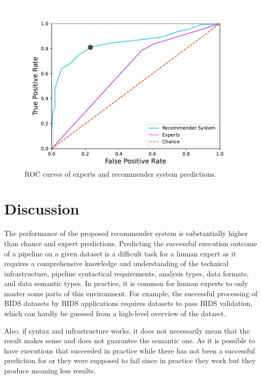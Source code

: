 \begin{figure}
\centering
  \includegraphics[width=\columnwidth]{figures/ROC Curve.pdf}
  \caption{ROC curves of experts and recommender system predictions.}
  \label{fig:roc-curve}
\end{figure}

\section{Discussion}

The performance of the proposed recommender system is substantially higher
than chance and expert predictions. Predicting the successful execution
outcome of a pipeline on a given dataset is a difficult task for a human expert as it requires a comprehensive knowledge and understanding of the technical infrastructure, pipeline syntactical requirements, analysis types, data formats, and data semantic types. In practice, it is common for human experts to only master some parts of this environment. For example,
the successful processing of BIDS datasets by BIDS applications requires
datasets to pass BIDS validation, which can hardly be guessed from a
high-level overview of the dataset. 

Also, if syntax and infrastructure works, it does not necessarily mean that the result makes sense and does not guarantee the semantic one. As it is possible to have executions that succeeded in practice while there has not been a successful prediction for or they were supposed to fail since in practice they work but they produce meaning less results. 


